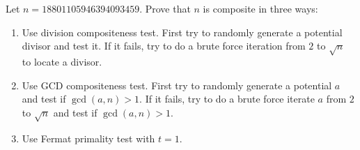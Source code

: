   Let $n = 18801105946394093459$.
  Prove that $n$ is composite in three ways:
  \begin{enumerate}[nosep,label=\textnormal{(\alph*)}]
  \item Use division compositeness test.
    First try to
    randomly generate a potential divisor and test it.
    If it fails, try to do a brute force iteration from $2$ to $\sqrt{n}$
    to locate a divisor.
  \item Use GCD compositeness test.
    First try to
    randomly generate a potential $a$ and test if $\gcd(a, n) > 1$.
    If it fails, try to do a brute force iterate $a$ from $2$ to $\sqrt{n}$
    and test if $\gcd(a, n) > 1$.
  \item
    Use Fermat primality test with $t = 1$.
  \end{enumerate}

